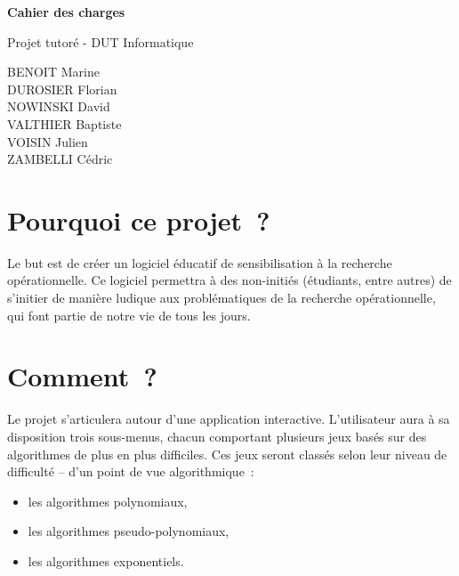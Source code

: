 \documentclass[12pt]{report}
\begin{document}
  \vspace*{\fill}
  \begin{center}
    {\bf \Large Cahier des charges}
  
    \vspace{3em}
  
    {\large Projet tutoré - DUT Informatique}
  
    \vspace{5em}
  
    BENOIT Marine \\
    DUROSIER Florian \\
    NOWINSKI David \\
    VALTHIER Baptiste \\
    VOISIN Julien \\
    ZAMBELLI Cédric
  \end{center}
  \vspace*{\fill}
  \newpage
  
  \tableofcontents
  
  \newpage
  
  \section{Pourquoi ce projet~?}
  
  Le but est de créer un logiciel éducatif de sensibilisation à
   la recherche opérationnelle. Ce logiciel permettra à des non-initiés
   (étudiants, entre autres) de s'initier de manière ludique aux
   problématiques de la recherche opérationnelle, qui font partie
   de notre vie de tous les jours.
 
 \section{Comment~?}
 
 Le projet s'articulera autour d'une application interactive.
  L'utilisateur aura à sa disposition trois sous-menus, chacun comportant
  plusieurs jeux basés sur des algorithmes de plus en plus difficiles.
  Ces jeux seront classés selon leur niveau de difficulté -- d'un point de
  vue algorithmique~:
 
 \begin{itemize}
   \item les algorithmes polynomiaux,
   \item les algorithmes pseudo-polynomiaux,
   \item les algorithmes exponentiels.
   \end{itemize}
 
\end{document}
